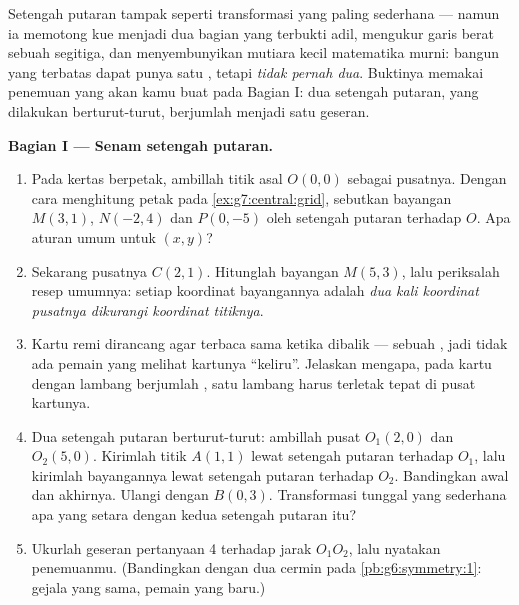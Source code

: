 \begin{problem}
\label{pb:g7:central:1}
Setengah putaran tampak seperti transformasi yang paling sederhana
--- namun ia memotong kue menjadi dua bagian yang terbukti adil,
mengukur garis berat sebuah segitiga, dan menyembunyikan mutiara kecil
matematika murni: bangun yang terbatas dapat punya satu ,
tetapi \emph{tidak pernah dua}. Buktinya memakai penemuan yang akan
kamu buat pada Bagian I: dua setengah putaran, yang dilakukan
berturut-turut, berjumlah menjadi satu geseran.

\medskip
\noindent\textbf{Bagian I --- Senam setengah putaran.}
\begin{enumerate}
  \item Pada kertas berpetak, ambillah titik asal $O(0, 0)$ sebagai
        pusatnya. Dengan cara menghitung petak pada
        \cref{ex:g7:central:grid}, sebutkan bayangan $M(3, 1)$,
        $N(-2, 4)$ dan $P(0, -5)$ oleh setengah putaran terhadap $O$.
        Apa aturan umum untuk $(x, y)$?
  \item Sekarang pusatnya $C(2, 1)$. Hitunglah bayangan $M(5, 3)$,
        lalu periksalah resep umumnya: setiap koordinat bayangannya
        adalah \emph{dua kali koordinat pusatnya dikurangi koordinat
        titiknya}.
  \item Kartu remi dirancang agar terbaca sama ketika dibalik ---
        sebuah , jadi tidak ada pemain yang melihat
        kartunya ``keliru''. Jelaskan mengapa, pada kartu dengan
        lambang berjumlah \emph{}, satu lambang harus terletak
        tepat di pusat kartunya.
  \item Dua setengah putaran berturut-turut: ambillah pusat
        $O_1(2, 0)$ dan $O_2(5, 0)$. Kirimlah titik $A(1, 1)$ lewat
        setengah putaran terhadap $O_1$, lalu kirimlah bayangannya
        lewat setengah putaran terhadap $O_2$. Bandingkan awal dan
        akhirnya. Ulangi dengan $B(0, 3)$. Transformasi tunggal yang
        sederhana apa yang setara dengan kedua setengah putaran itu?
  \item Ukurlah geseran pertanyaan 4 terhadap jarak $O_1 O_2$, lalu
        nyatakan penemuanmu. (Bandingkan dengan dua cermin 
        pada \cref{pb:g6:symmetry:1}: gejala yang sama, pemain yang
        baru.)
\end{enumerate}


\end{problem}
